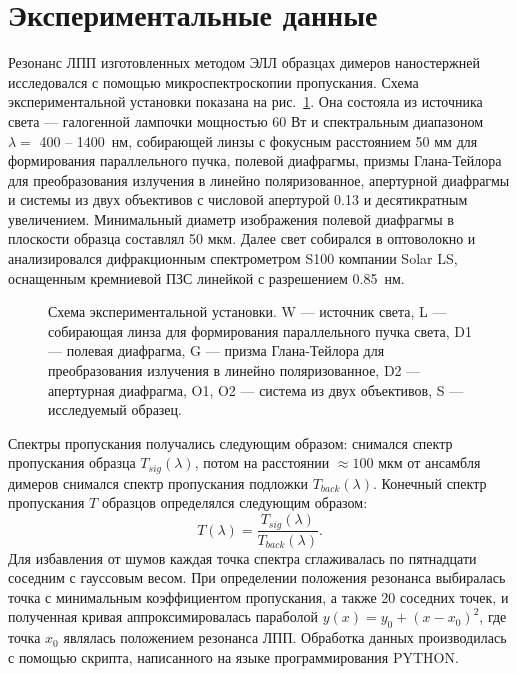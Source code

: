 \section{Экспериментальные данные}

Резонанс ЛПП изготовленных методом ЭЛЛ образцах димеров наностержней исследовался с помощью микроспектроскопии пропускания. Схема экспериментальной установки показана на рис.~\ref{img:expsetup}. Она состояла из источника света --- галогенной лампочки мощностью 60 Вт и спектральным диапазоном $ \lambda =  $ 400 -- 1400~нм, собирающей линзы с фокусным расстоянием 50 мм для формирования параллельного пучка, полевой диафрагмы, призмы Глана-Тейлора для преобразования излучения в линейно поляризованное, апертурной диафрагмы и системы из двух объективов с числовой апертурой 0.13 и десятикратным увеличением. Минимальный диаметр изображения полевой диафрагмы в плоскости образца составлял 50 мкм. Далее свет собирался в оптоволокно и анализировался дифракционным спектрометром S100 компании Solar LS, оснащенным кремниевой ПЗС линейкой с разрешением 0.85~нм.
\begin{figure}
\caption{Схема экспериментальной установки. W --- источник света, L --- собирающая линза для формирования параллельного пучка света, D1 --- полевая диафрагма, G --- призма Глана-Тейлора для преобразования излучения в линейно поляризованное, D2 --- апертурная диафрагма, O1, O2 --- система из двух объективов, S --- исследуемый образец. }
\label{img:expsetup}
\end{figure}
Спектры пропускания получались следующим образом: снимался спектр пропускания образца $ T_{sig} (\lambda) $, потом на расстоянии $ \approx 100 $ мкм от ансамбля димеров снимался спектр пропускания подложки $ T_{back} (\lambda) $. Конечный спектр пропускания $ T $ образцов определялся следующим образом:
\begin{equation}
T(\lambda) = \frac{T_{sig} (\lambda)}{T_{back} (\lambda)}.
\end{equation}
Для избавления от шумов каждая точка спектра сглаживалась по пятнадцати соседним с гауссовым весом. При определении положения резонанса выбиралась точка с минимальным коэффициентом пропускания, а также 20 соседних точек, и полученная кривая аппроксимировалась параболой $ y(x) = y_0 + (x - x_0)^2 $, где точка $ x_0 $ являлась положением резонанса ЛПП. Обработка данных производилась с помощью скрипта, написанного на языке программирования PYTHON.

